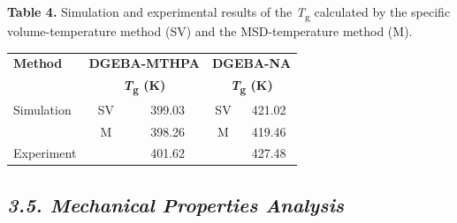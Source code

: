 \documentclass{article}
\begin{document}
\begin{center}
\noindent\textbf{Table 4.} Simulation and experimental results of the \emph{T}\textsubscript{g} calculated by the specific volume-temperature method (SV) and the MSD-temperature method (M).

\smallskip
\begin{tabular}{lcccc}
\toprule
\textbf{Method} & \multicolumn{2}{c}{\textbf{DGEBA-MTHPA}} & \multicolumn{2}{c}{\textbf{DGEBA-NA}} \\
 & \multicolumn{2}{c}{\textbf{\emph{T}\textsubscript{g} (K)}} & \multicolumn{2}{c}{\textbf{\emph{T}\textsubscript{g} (K)}} \\
\midrule
Simulation & SV & 399.03 & SV & 421.02 \\
 & M & 398.26 & M & 419.46 \\
\midrule
Experiment & & 401.62 & & 427.48 \\
\bottomrule
\end{tabular}
\end{center}

\subsection*{\emph{3.5. Mechanical Properties Analysis}}
\end{document}
